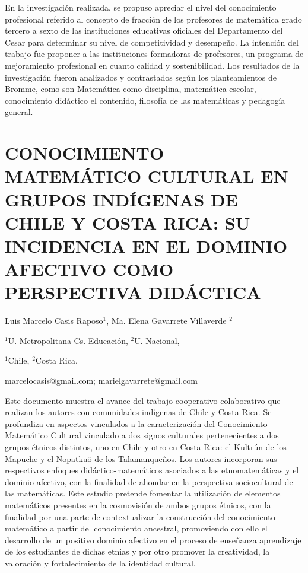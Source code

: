 En la investigación realizada, se propuso apreciar el nivel del conocimiento
profesional referido al concepto de fracción de los profesores de
matemática grado tercero a sexto de las instituciones educativas oficiales
del Departamento del Cesar para determinar su nivel de competitividad
y desempeño. La intención del trabajo fue proponer a las instituciones
formadoras de profesores, un programa de mejoramiento profesional
en cuanto calidad y sostenibilidad. Los resultados de la investigación
fueron analizados y contrastados según los planteamientos de Bromme,
como son Matemática como disciplina, matemática escolar, conocimiento
didáctico el contenido, filosofía de las matemáticas y pedagogía general.


\section{CONOCIMIENTO MATEMÁTICO CULTURAL EN GRUPOS INDÍGENAS DE CHILE Y COSTA
RICA: SU INCIDENCIA EN EL DOMINIO AFECTIVO COMO PERSPECTIVA DIDÁCTICA}

\begin{datos}

Luis Marcelo Casis Raposo$^{1}$, Ma. Elena Gavarrete Villaverde $^{2}$

$^{1}$U. Metropolitana Cs. Educación, $^{2}$U. Nacional,

$^{1}$Chile, $^{2}$Costa Rica,

marcelocasis@gmail.com; marielgavarrete@gmail.com

\end{datos}

Este documento muestra el avance del trabajo cooperativo colaborativo
que realizan los autores con comunidades indígenas de Chile y Costa
Rica. Se profundiza en aspectos vinculados a la caracterización del
Conocimiento Matemático Cultural vinculado a dos signos culturales
pertenecientes a dos grupos étnicos distintos, uno en Chile y otro
en Costa Rica: el Kultrún de los Mapuche y el Nopatkuö de los Talamanqueños.
Los autores incorporan sus respectivos enfoques didáctico-matemáticos
asociados a las etnomatemáticas y el dominio afectivo, con la finalidad
de ahondar en la perspectiva sociocultural de las matemáticas. Este
estudio pretende fomentar la utilización de elementos matemáticos
presentes en la cosmovisión de ambos grupos étnicos, con la finalidad
por una parte de contextualizar la construcción del conocimiento matemático
a partir del conocimiento ancestral, promoviendo con ello el desarrollo
de un positivo dominio afectivo en el proceso de enseñanza aprendizaje
de los estudiantes de dichas etnias y por otro promover la creatividad,
la valoración y fortalecimiento de la identidad cultural. 


